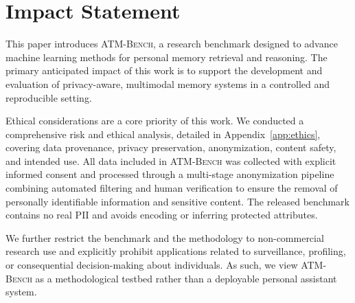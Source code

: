 \documentclass{article}
\theoremstyle{plain}
\theoremstyle{definition}
\theoremstyle{remark}
\begin{document}
\newpage

\section*{Impact Statement}


This paper introduces \textsc{ATM-Bench}, a research benchmark designed to advance machine learning methods for personal memory retrieval and reasoning. The primary anticipated impact of this work is to support the development and evaluation of privacy-aware, multimodal memory systems in a controlled and reproducible setting.

Ethical considerations are a core priority of this work. We conducted a comprehensive risk and ethical analysis, detailed in Appendix~\ref{app:ethics}, covering data provenance, privacy preservation, anonymization, content safety, and intended use. All data included in \textsc{ATM-Bench} was collected with explicit informed consent and processed through a multi-stage anonymization pipeline combining automated filtering and human verification to ensure the removal of personally identifiable information and sensitive content. The released benchmark contains no real PII and avoids encoding or inferring protected attributes.

We further restrict the benchmark and the methodology to non-commercial research use and explicitly prohibit applications related to surveillance, profiling, or consequential decision-making about individuals. As such, we view \textsc{ATM-Bench} as a methodological testbed rather than a deployable personal assistant system.
\end{document}
